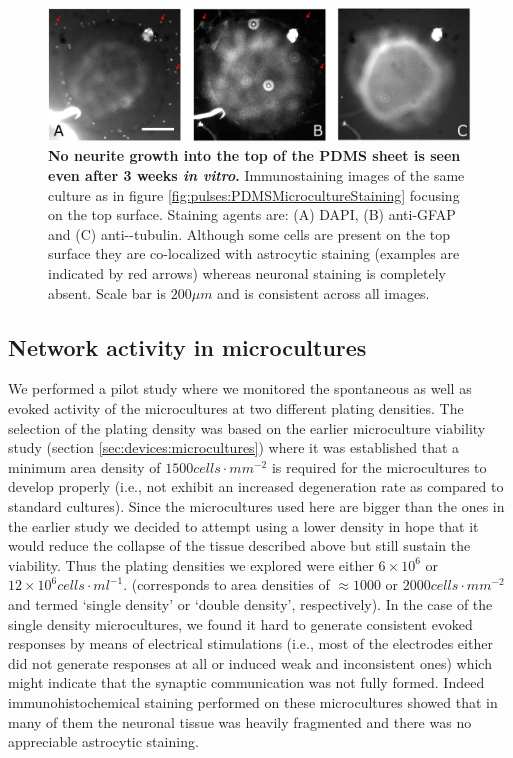    \begin{figure}[!htb]
       \centering
       \includegraphics[width=15cm]{chapter6/figures/topOfSheetSTaining/topOfSheetStaining.jpg}
        \caption[Effectiveness of surface-then-bond in maintaining an isolated microculture - immunostaining evidence]{\textbf{No neurite growth into the top of the PDMS sheet is seen even after 3 weeks \textit{in vitro}.} Immunostaining images of the same culture as in figure \ref{fig:pulses:PDMSMicrocultureStaining} focusing on the top surface. Staining agents are: (A) DAPI, (B) anti-GFAP and (C) anti-\textbeta-tubulin. Although some cells are present on the top surface they are co-localized with astrocytic staining (examples are indicated by red arrows) whereas neuronal staining is completely absent. Scale bar is \(200 \mu m\) and is consistent across all images.}
       \label{fig:pulses:topOfSheetTaining}
   \end{figure}

   \subsection{Network activity in microcultures}
   We performed a pilot study where we monitored the spontaneous as well as evoked activity of the microcultures at two different plating densities. The selection of the plating density was based on the earlier microculture viability study (section \ref{sec:devices:microcultures}) where it was established that a minimum area density of \(1500 cells\cdot mm^{-2}\) is required for the microcultures to develop properly (i.e., not exhibit an increased degeneration rate as compared to standard cultures). Since the microcultures used here are bigger than the ones in the earlier study we decided to attempt using a lower density in hope that it would reduce the collapse of the tissue described above but still sustain the viability. Thus the plating densities we explored were either \(6\times 10^{6}\) or \(12\times 10^{6} cells\cdot ml^{-1}\). (corresponds to area densities of \(\approx 1000\) or \(2000 cells\cdot mm^{-2}\) and termed `single density' or `double density', respectively). In the case of the single density microcultures, we found it hard to generate consistent evoked responses by means of electrical stimulations (i.e., most of the electrodes either did not generate responses at all or induced weak and inconsistent ones) which might indicate that the synaptic communication was not fully formed. Indeed immunohistochemical staining performed on these microcultures showed that in many of them the neuronal tissue was heavily fragmented and there was no appreciable astrocytic staining.

